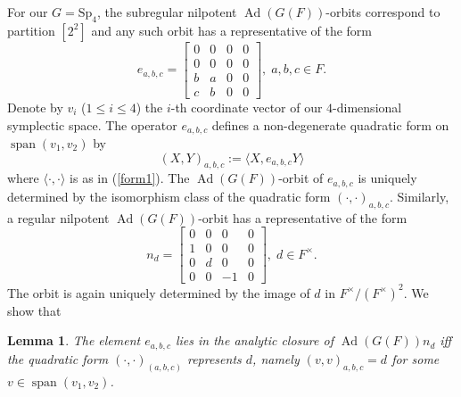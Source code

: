 \documentclass[11pt]{amsart}
\newtheorem{lemma}[theorem]{Lemma}
\theoremstyle{remark}
\newcommand{\Ad}{\operatorname{Ad}}
\renewcommand{\span}{\operatorname{span}}
\newcommand{\matr}[1]{\left[\begin{matrix}#1\end{matrix}\right]}
\newcommand{\Sp}{\mathrm{Sp}}
\begin{document}
For our $G=\Sp_4$, the subregular nilpotent $\Ad(G(F))$-orbits correspond to partition $[2^2]$ and any such orbit has a representative of the form
\[
e_{a,b,c}=\matr{
	0&0&0&0\\
	0&0&0&0\\
	b&a&0&0\\
	c&b&0&0
},\;a,b,c\in F.
\]
Denote by $v_i$ ($1\le i\le 4$) the $i$-th coordinate vector of our $4$-dimensional symplectic space.
The operator $e_{a,b,c}$ defines a non-degenerate quadratic form on $\span(v_1,v_2)$ by 
\begin{equation}\label{eq:quadform}
(X,Y)_{a,b,c}:=\langle X,e_{a,b,c}Y\rangle
\end{equation}
where $\langle\cdot,\cdot\rangle$ is as in (\ref{form1}). The $\Ad(G(F))$-orbit of $e_{a,b,c}$ is uniquely determined \cite[Prop. 5]{Nev11} by the isomorphism class of the quadratic form $(\cdot,\cdot)_{a,b,c}$. Similarly, a regular nilpotent $\Ad(G(F))$-orbit has a representative of the form
\begin{equation}\label{regnil}
n_d=\matr{
	0&0&0&0\\
	1&0&0&0\\
	0&d&0&0\\
	0&0&-1&0
},\; d\in F^{\times}.
\end{equation}
The orbit is again uniquely determined by the image of $d$ in $F^{\times}/(F^{\times})^2$. We show that
\begin{lemma}\label{lem:quad} The element $e_{a,b,c}$ lies in the analytic closure of $\Ad(G(F))n_d$ iff the quadratic form $(\cdot,\cdot)_{(a,b,c)}$ represents $d$, namely $(v,v)_{a,b,c}=d$ for some $v\in \span(v_1,v_2)$.
\end{lemma}
\end{document}
